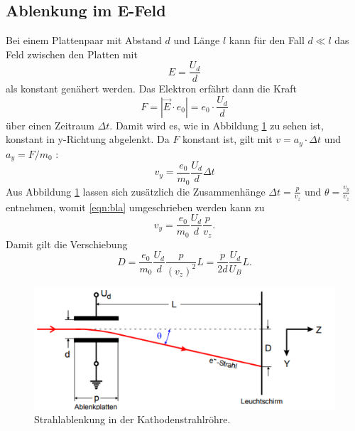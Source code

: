 \subsection{Ablenkung im E-Feld} \label{sec:AiE}
Bei einem Plattenpaar mit Abstand $d$ und Länge $l$ kann für den Fall $d \ll l$ das Feld zwischen den Platten mit
\begin{equation}
E=\frac{U_d}{d}
\end{equation}
als konstant genähert werden. Das Elektron erfährt dann die Kraft
\begin{equation}
  F= \left | \vec{E}\cdot e_0 \right | = e_0 \cdot \frac{U_d}{d}
\end{equation}
über einen Zeitraum $\Delta t$. Damit wird es, wie in Abbildung \ref{fig:SidK} zu sehen ist, konstant in y-Richtung abgelenkt.
Da $F$ konstant ist, gilt mit $v=a_y \cdot \Delta t$ und $a_y = F/m_0$ :
\begin{equation}
  v_y=\frac{e_0}{m_0}\frac{U_d}{d}\Delta t \label{eqn:bla}
\end{equation}
Aus Abbildung \ref{fig:SidK} lassen sich zusätzlich die Zusammenhänge $\Delta t =\frac{p}{v_z}$ und $\theta=\frac{v_y}{v_z}$
entnehmen, womit \eqref{eqn:bla} umgeschrieben werden kann zu
\begin{equation}
  v_y=\frac{e_0}{m_0} \frac{U_d}{d} \frac{p}{v_z} \text{.}
\end{equation}
Damit gilt die Verschiebung
\begin{equation}
  D=\frac{e_0}{m_0} \frac{U_d}{d} \frac{p}{(v_z)^2}L =\frac{p}{2d}\frac{U_d}{U_B}L \text{.}
\end{equation}
\begin{figure}
  \includegraphics[width=\linewidth-100pt,height=\textheight-100pt,keepaspectratio]{Text/Bilder/Ablenkplatten.png}
  \caption{Strahlablenkung in der Kathodenstrahlröhre\cite[83]{sample}.}
  \label{fig:SidK}
\end{figure}

